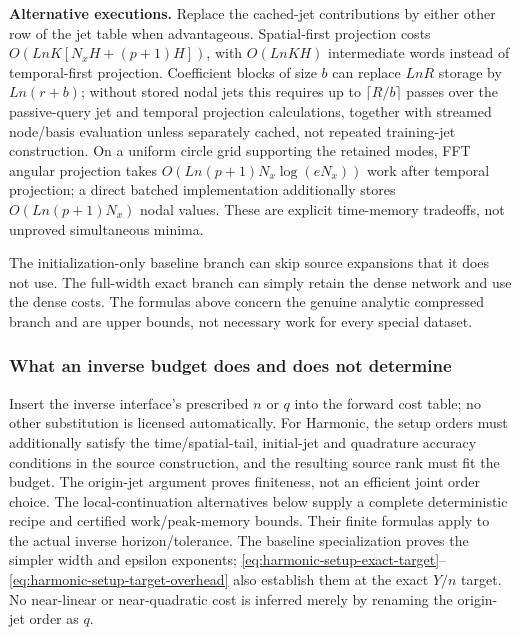 
\textbf{Alternative executions.} Replace the cached-jet contributions by either other row of the jet table when advantageous. Spatial-first projection costs \(O(LnK[N_xH+(p+1)H])\), with \(O(LnKH)\) intermediate words instead of temporal-first projection. Coefficient blocks of size \(b\) can replace \(LnR\) storage by \(Ln(r+b)\); without stored nodal jets this requires up to \(\lceil R/b\rceil\) passes over the passive-query jet and temporal projection calculations, together with streamed node/basis evaluation unless separately cached, not repeated training-jet construction. On a uniform circle grid supporting the retained modes, FFT angular projection takes \(O(Ln(p+1)N_x\log(eN_x))\) work after temporal projection; a direct batched implementation additionally stores \(O(Ln(p+1)N_x)\) nodal values. These are explicit time-memory tradeoffs, not unproved simultaneous minima.



The initialization-only baseline branch can skip source expansions that it does not use. The full-width exact branch can simply retain the dense network and use the dense costs. The formulas above concern the genuine analytic compressed branch and are upper bounds, not necessary work for every special dataset.


\subsubsection{What an inverse budget does and does not determine}



Insert the inverse interface's prescribed \(n\) or \(q\) into the forward cost table; no other substitution is licensed automatically. For Harmonic, the setup orders must additionally satisfy the time/spatial-tail, initial-jet and quadrature accuracy conditions in the source construction, and the resulting source rank must fit the budget. The origin-jet argument proves finiteness, not an efficient joint order choice. The local-continuation alternatives below supply a complete deterministic recipe and certified work/peak-memory bounds. Their finite formulas apply to the actual inverse horizon/tolerance. The baseline specialization proves the simpler width and epsilon exponents; \eqref{eq:harmonic-setup-exact-target}--\eqref{eq:harmonic-setup-target-overhead} also establish them at the exact \(Y/n\) target. No near-linear or near-quadratic cost is inferred merely by renaming the origin-jet order as \(q\).


